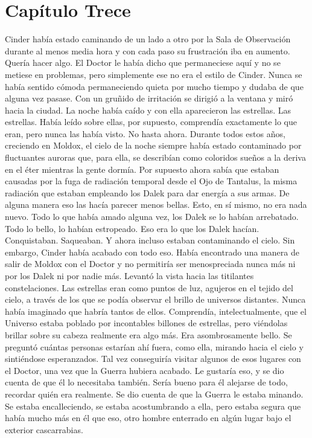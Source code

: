 \chapter*{Capítulo Trece}

Cinder había estado caminando de un lado a otro por la Sala de Observación durante al menos media hora y con cada paso su frustración iba en aumento. Quería hacer algo. El Doctor le había dicho que permaneciese aquí y no se metiese en problemas, pero simplemente ese no era el estilo de Cinder. Nunca se había sentido cómoda permaneciendo quieta por mucho tiempo y dudaba de que alguna vez pasase. Con un gruñido de irritación se dirigió a la ventana y miró hacia la ciudad. La noche había caído y con ella aparecieron las estrellas. 
Las estrellas. Había leído sobre ellas, por supuesto, comprendía exactamente lo que eran, pero nunca las había visto. No hasta ahora. Durante todos estos años, creciendo en Moldox, el cielo de la noche siempre había estado contaminado por fluctuantes auroras que, para ella, se describían como coloridos sueños a la deriva en el éter mientras la gente dormía. Por supuesto ahora sabía que estaban causadas por la fuga de radiación temporal desde el Ojo de Tantalus, la misma radiación que estaban empleando los Dalek para dar energía a sus armas. 
De alguna manera eso las hacía parecer menos bellas. Esto, en sí mismo, no era nada nuevo. Todo lo que había amado alguna vez, los Dalek se lo habían arrebatado. Todo lo bello, lo habían estropeado. Eso era lo que los Dalek hacían. Conquistaban. Saqueaban. Y ahora incluso estaban contaminando el cielo. 
Sin embargo, Cinder había acabado con todo eso. Había encontrado una manera de salir de Moldox con el Doctor y no permitiría ser menospreciada nunca más ni por los Dalek ni por nadie más. 
Levantó la vista hacia las titilantes constelaciones. Las estrellas eran como puntos de luz, agujeros en el tejido del cielo, a través de los que se podía observar el brillo de universos distantes. Nunca había imaginado que habría tantos de ellos. Comprendía, intelectualmente, que el Universo estaba poblado por incontables billones de estrellas, pero viéndolas brillar sobre su cabeza realmente era algo más. Era asombrosamente bello. 
Se preguntó cuántas personas estarían ahí fuera, como ella, mirando hacia el cielo y sintiéndose esperanzados. Tal vez conseguiría visitar algunos de esos lugares con el Doctor, una vez que la Guerra hubiera acabado. Le gustaría eso, y se dio cuenta de que él lo necesitaba también. Sería bueno para él alejarse de todo, recordar quién era realmente. Se dio cuenta de que la Guerra le estaba minando. Se estaba encalleciendo, se estaba acostumbrando a ella, pero estaba segura que había mucho más en él que eso, otro hombre enterrado en algún lugar bajo el exterior cascarrabias. 
